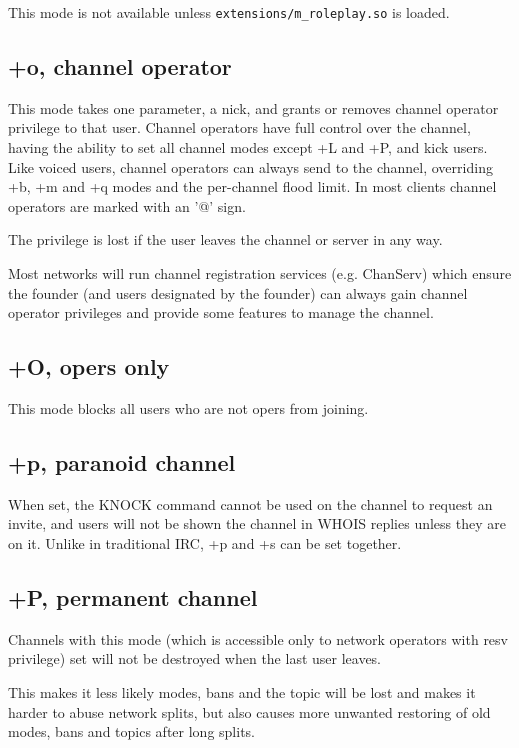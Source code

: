 	This mode is not available unless \nolinkurl{extensions/m\_roleplay.so} is loaded.

\subsection{+o, channel operator}
	This mode takes one parameter, a nick, and grants or removes channel
	operator privilege to that user. Channel operators have full control
	over the channel, having the ability to set all channel modes except
	+L and +P, and kick users. Like voiced users, channel operators can
	always send to the channel, overriding +b, +m and +q modes and the
	per-{}channel flood limit.
	In most clients channel operators are marked with an '@' sign.

	The privilege is lost if the user leaves the channel or server
	in any way.

	Most networks will run channel registration services (e.g. ChanServ)
	which ensure the founder (and users designated by the founder) can
	always gain channel operator privileges and provide some features to
	manage the channel.

\subsection{+O, opers only}
	This mode blocks all users who are not opers from joining.


\subsection{+p, paranoid channel}
	When set, the KNOCK command cannot be used on the channel to request an
	invite, and users will not be shown the	channel in WHOIS replies unless
	they are on it. Unlike in traditional IRC, +p and +s can be set
	together.

\subsection{+P, permanent channel}
	Channels with this mode (which is accessible only to network operators
	with resv privilege) set will not be destroyed when the last user
	leaves.

	This makes it less likely modes, bans and the topic will be lost and
	makes it harder to abuse network splits, but also causes more unwanted
	restoring of old modes, bans and topics after long splits.

